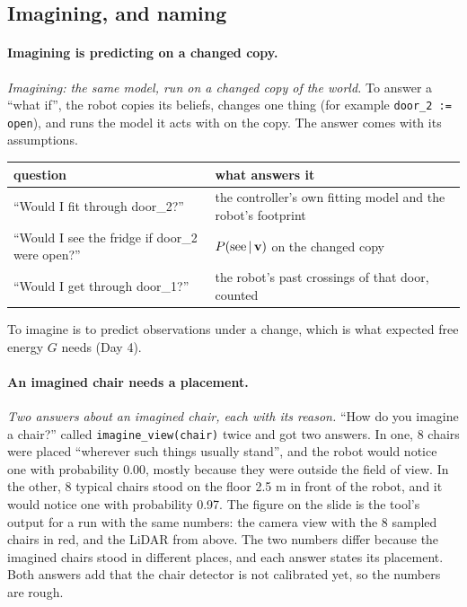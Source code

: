 \documentclass[11pt]{article}
\newcommand{\slt}[1]{\emph{#1}}   %
\begin{document}
\subsection{Imagining, and naming}

\paragraph{Imagining is predicting on a changed copy.} \slt{Imagining: the same model, run on a changed copy of the world.} To answer a ``what if'', the robot copies its beliefs, changes one thing (for example \texttt{door\_2 := open}), and runs the model it acts with on the copy. The answer comes with its assumptions.
\begin{center}\small
\begin{tabular}{@{}p{6.0cm} p{8.0cm}@{}}
\toprule
question & what answers it\\\midrule
``Would I fit through door\_2?'' & the controller's own fitting model and the robot's footprint\\
``Would I see the fridge if door\_2 were open?'' & $P(\text{see}\,|\,\mathbf v)$ on the changed copy\\
``Would I get through door\_1?'' & the robot's past crossings of that door, counted\\
\bottomrule
\end{tabular}
\end{center}
To imagine is to predict observations under a change, which is what expected free energy $G$ needs (Day 4).

\paragraph{An imagined chair needs a placement.} \slt{Two answers about an imagined chair, each with its reason.} ``How do you imagine a chair?'' called \texttt{imagine\_view(chair)} twice and got two answers. In one, 8 chairs were placed ``wherever such things usually stand'', and the robot would notice one with probability 0.00, mostly because they were outside the field of view. In the other, 8 typical chairs stood on the floor 2.5 m in front of the robot, and it would notice one with probability 0.97. The figure on the slide is the tool's output for a run with the same numbers: the camera view with the 8 sampled chairs in red, and the LiDAR from above. The two numbers differ because the imagined chairs stood in different places, and each answer states its placement. Both answers add that the chair detector is not calibrated yet, so the numbers are rough.
\end{document}
